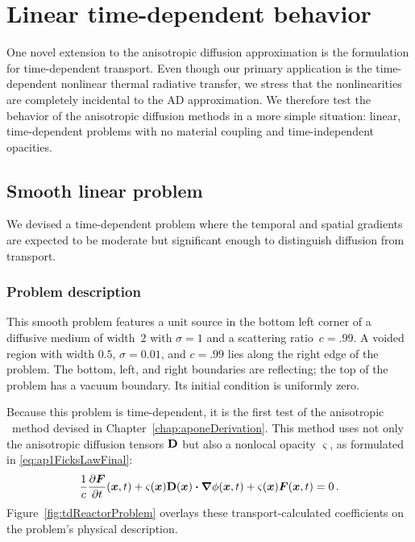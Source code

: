 \clearpage
\section{Linear time-dependent behavior}

One novel extension to the anisotropic diffusion approximation is the
formulation for time-dependent transport. Even though our primary application is
the time-dependent nonlinear thermal radiative transfer, we stress that the
nonlinearities are completely incidental to the AD approximation. We therefore 
test the behavior of the anisotropic diffusion methods in a more simple
situation: linear, time-dependent problems with no material
coupling and time-independent opacities.

\subsection{Smooth linear problem}

We devised a time-dependent problem where the temporal and spatial gradients are
expected to be moderate but significant enough to distinguish diffusion from
transport.

\subsubsection{Problem description}

This smooth problem features a unit source in the bottom left corner of a
diffusive medium of width~$2$ with
$\sigma=1$ and a scattering ratio~$c=.99$. A voided region with width $0.5$,
$\sigma=0.01$, and $c=.99$ lies along the right edge of the problem. The bottom,
left, and right boundaries are reflecting; the top of the problem has a vacuum
boundary. Its initial condition is uniformly zero.

Because this problem is time-dependent, it is the first test of the anisotropic
\Pone\ method devised in Chapter~\ref{chap:aponeDerivation}. This method
uses not only the anisotropic diffusion tensors $\mathbf{D}$ but also a nonlocal
opacity $\varsigma$, as formulated in \eqref{eq:ap1FicksLawFinal}:
\begin{equation*}
  \frac{1}{c}\frac{\partial \bm{F}}{\partial t}(\bm{x},t)
  + \varsigma(\bm{x}) \mathbf{D}(\bm{x}) \bm{\cdot} \bm{\nabla} \phi(\bm{x}, t)
  + \varsigma(\bm{x})\bm{F}(\bm{x},t) 
  = 0 \,.
\end{equation*}
Figure~\ref{fig:tdReactorProblem} overlays these transport-calculated
coefficients on the problem's physical description.

